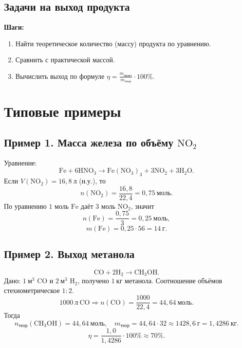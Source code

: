 \documentclass[a4paper,12pt]{article}
\begin{document}
\subsection{Задачи на выход продукта}
\textbf{Шаги:}
\begin{enumerate}
    \item Найти теоретическое количество (массу) продукта по уравнению.
    \item Сравнить с практической массой.
    \item Вычислить выход по формуле \(\eta = \frac{m_{\text{практ}}}{m_{\text{теор}}}\cdot 100\%\).
\end{enumerate}

\section{Типовые примеры}

\subsection*{Пример 1. Масса железа по объёму \(\mathrm{NO_2}\)}
Уравнение:
\[
\mathrm{Fe + 6HNO_3 \rightarrow Fe(NO_3)_3 + 3NO_2 + 3H_2O}.
\]
Если \(V(\mathrm{NO_2})=16{,}8\ \mathrm{л}\) (н.у.), то
\[
 n(\mathrm{NO_2})=\frac{16{,}8}{22{,}4}=0{,}75\ \mathrm{моль}.
\]
По уравнению \(1\) моль \(\mathrm{Fe}\) даёт \(3\) моль \(\mathrm{NO_2}\), значит
\[
 n(\mathrm{Fe})=\frac{0{,}75}{3}=0{,}25\ \mathrm{моль},
\]
\[
 m(\mathrm{Fe})=0{,}25\cdot 56=14\ \mathrm{г}.
\]

\subsection*{Пример 2. Выход метанола}
\[
\mathrm{CO + 2H_2 \rightarrow CH_3OH}.
\]
Дано: \(1\ \mathrm{м^3}\) \(\mathrm{CO}\) и \(2\ \mathrm{м^3}\) \(\mathrm{H_2}\), получено \(1\ \mathrm{кг}\) метанола.
Соотношение объёмов стехиометрическое \(1:2\).
\[
1000\ \mathrm{л\ CO} \Rightarrow n(\mathrm{CO})=\frac{1000}{22{,}4}=44{,}64\ \mathrm{моль}.
\]
Тогда
\[
 n_{\text{теор}}(\mathrm{CH_3OH})=44{,}64\ \mathrm{моль}, \quad
 m_{\text{теор}}=44{,}64\cdot 32\approx 1428{,}6\ \mathrm{г}=1{,}4286\ \mathrm{кг}.
\]
\[
 \eta=\frac{1{,}0}{1{,}4286}\cdot 100\%\approx 70\%.
\]
\end{document}
